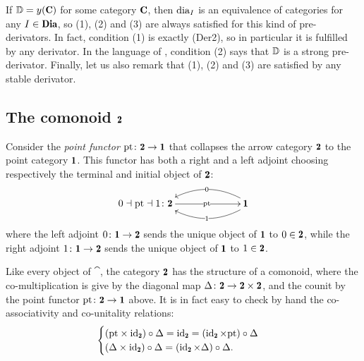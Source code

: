If $\D=y(\C)$ for some category $\C$, then $\text{dia}_I$ is an equivalence of categories for any $I\in \Dia$, so (1), (2) and (3) are always satisfied for this kind of pre-derivators. In fact, condition (1) is exactly (Der2), so in particular it is fulfilled by any derivator. In the language of \cite{Moritz}, condition (2) says that $\mathbb{D}$ is a strong pre-derivator. Finally, let us also remark that (1), (2) and (3) are satisfied by any stable derivator.

\subsection{The comonoid $\due$}\label{comonoid_due_subs}
Consider the \emph{point functor} $\pt\colon \due\to \uno$ that collapses the arrow category $\due$ to the point category $\uno$. This functor has both a right and a left adjoint choosing respectively the terminal and initial object of $\due$:
\[
\xymatrix@C=1.5cm{
**[l] 0\dashv \pt \dashv 1\colon \due\ar[r]|\pt & \ar@/_-1pc/@<3pt>[l]|{1}\ar@/_1pc/@<-3pt>[l]|{0} {\uno}
}
\]
where the left adjoint $0\colon \uno\to \due$ sends the unique object of $\uno$ to $0\in \due$, while the right adjoint $1\colon \uno\to \due$ sends the unique object of $\uno$ to $1\in \due$. 


\begin{remark}\label{two-comonoid}
Like every object of $\cat$, the category $\due$ has the structure of a comonoid, where the co-multiplication is give by the diagonal map $\Delta\colon \due\to \due\times\due$, and the counit by the point functor $\pt\colon \due \to \uno$ above. It is in fact easy to check by hand the co-associativity and co-unitality relations:
\[\begin{cases}
(\pt\times \id_\due)\circ\Delta=\id_\due=(\id_\due\times \pt)\circ\Delta\notag\\
(\Delta\times\id_\due)\circ\Delta=(\id_\due\times \Delta)\circ\Delta.
\end{cases}\]
\end{remark}

